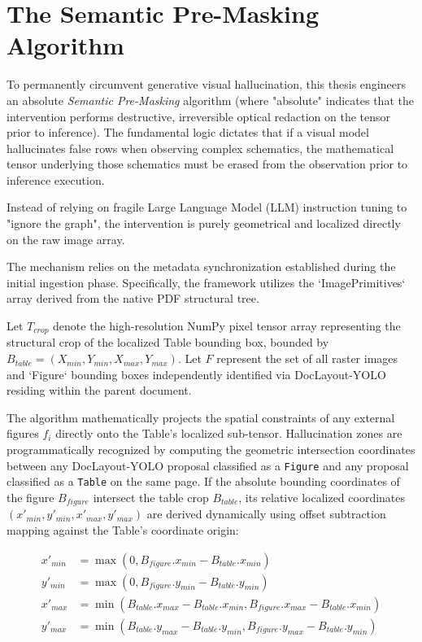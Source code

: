 \section{The Semantic Pre-Masking Algorithm}
\label{sec:pre_masking_logic}

To permanently circumvent generative visual hallucination, this thesis engineers an absolute \textit{Semantic Pre-Masking} algorithm (where "absolute" indicates that the intervention performs destructive, irreversible optical redaction on the tensor prior to inference). The fundamental logic dictates that if a visual model hallucinates false rows when observing complex schematics, the mathematical tensor underlying those schematics must be erased from the observation prior to inference execution.

Instead of relying on fragile Large Language Model (LLM) instruction tuning to "ignore the graph", the intervention is purely geometrical and localized directly on the raw image array.

The mechanism relies on the metadata synchronization established during the initial ingestion phase. Specifically, the framework utilizes the `ImagePrimitives` array derived from the native PDF structural tree.

Let $T_{crop}$ denote the high-resolution NumPy pixel tensor array representing the structural crop of the localized Table bounding box, bounded by $B_{table} = (X_{min}, Y_{min}, X_{max}, Y_{max})$.
Let $F$ represent the set of all raster images and `Figure` bounding boxes independently identified via DocLayout-YOLO residing within the parent document.

The algorithm mathematically projects the spatial constraints of any external figures $f_i$ directly onto the Table's localized sub-tensor. Hallucination zones are programmatically recognized by computing the geometric intersection coordinates between any DocLayout-YOLO proposal classified as a \texttt{Figure} and any proposal classified as a \texttt{Table} on the same page. If the absolute bounding coordinates of the figure $B_{figure}$ intersect the table crop $B_{table}$, its relative localized coordinates $(x'_{min}, y'_{min}, x'_{max}, y'_{max})$ are derived dynamically using offset subtraction mapping against the Table's coordinate origin:

\begin{equation}
\begin{split}
x'_{min} &= \max(0, B_{figure}.x_{min} - B_{table}.x_{min}) \\
y'_{min} &= \max(0, B_{figure}.y_{min} - B_{table}.y_{min}) \\
x'_{max} &= \min(B_{table}.x_{max} - B_{table}.x_{min}, B_{figure}.x_{max} - B_{table}.x_{min}) \\
y'_{max} &= \min(B_{table}.y_{max} - B_{table}.y_{min}, B_{figure}.y_{max} - B_{table}.y_{min})
\end{split}
\end{equation}

